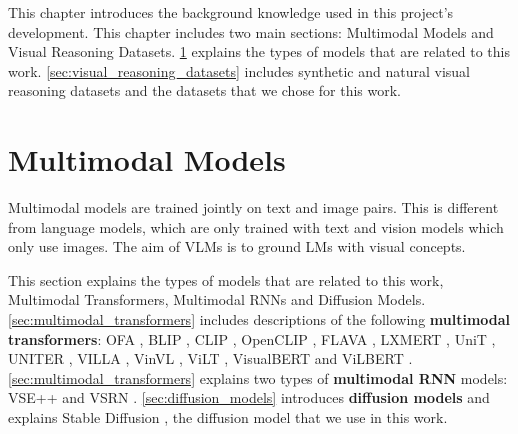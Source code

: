 This chapter introduces the background knowledge used in this project's development. This chapter includes two main sections: Multimodal Models and Visual Reasoning Datasets. \cref{sec:multimodal_models} explains the types of models that are related to this work. \cref{sec:visual_reasoning_datasets} includes synthetic and natural visual reasoning datasets and the datasets that we chose for this work.

\section{Multimodal Models} \label{sec:multimodal_models}

Multimodal models are trained jointly on text and image pairs. This is different from language models, which are only trained with text and vision models which only use images. The aim of VLMs is to ground LMs with visual concepts.

This section explains the types of models that are related to this work, Multimodal Transformers, Multimodal RNNs and Diffusion Models. \cref{sec:multimodal_transformers} includes descriptions of the following \textbf{multimodal transformers}: OFA \cite{wang2022unifying}, BLIP \cite{li2022blip}, CLIP \cite{radford2021clip}, OpenCLIP \cite{ilharco_gabriel_2021_5143773}, FLAVA \cite{singh2022flava}, LXMERT \cite{tan2020lxmert}, UniT \cite{hu2021unit}, UNITER \cite{chen2020uniter}, VILLA \cite{gan2020villa}, VinVL \cite{zhang2021vinvl}, ViLT \cite{kim2021vilt}, VisualBERT \cite{li2019visualbert} and ViLBERT \cite{lu2019vilbert}. \cref{sec:multimodal_transformers} explains two types of \textbf{multimodal RNN} models: VSE++ \cite{faghri2018vse} and VSRN \cite{li2019vsrn}. \cref{sec:diffusion_models} introduces \textbf{diffusion models} and explains Stable Diffusion \cite{rombach2021highresolution}, the diffusion model that we use in this work.

